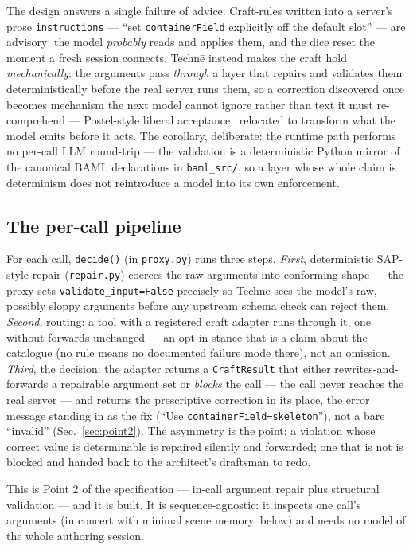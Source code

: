 \documentclass[sigconf,nonacm,screen,anonymous]{acmart}
\begin{document}
The design answers a single failure of advice. Craft-rules written into a server's prose \texttt{instructions} --- ``set \texttt{containerField} explicitly off the default slot'' --- are advisory: the model \emph{probably} reads and applies them, and the dice reset the moment a fresh session connects. Technē instead makes the craft hold \emph{mechanically}: the arguments pass \emph{through} a layer that repairs and validates them deterministically before the real server runs them, so a correction discovered once becomes mechanism the next model cannot ignore rather than text it must re-comprehend --- Postel-style liberal acceptance~\cite{postel} relocated to transform what the model emits before it acts. The corollary, deliberate: the runtime path performs no per-call LLM round-trip --- the validation is a deterministic Python mirror of the canonical BAML declarations in \texttt{baml\_src/}, so a layer whose whole claim is determinism does not reintroduce a model into its own enforcement.

\subsection{The per-call pipeline}

For each call, \texttt{decide()} (in \texttt{proxy.py}) runs three steps. \emph{First}, deterministic SAP-style repair (\texttt{repair.py}) coerces the raw arguments into conforming shape --- the proxy sets \texttt{validate\_input=False} precisely so Technē sees the model's raw, possibly sloppy arguments before any upstream schema check can reject them. \emph{Second}, routing: a tool with a registered craft adapter runs through it, one without forwards unchanged --- an opt-in stance that is a claim about the catalogue (no rule means no documented failure mode there), not an omission. \emph{Third}, the decision: the adapter returns a \texttt{CraftResult} that either rewrites-and-forwards a repairable argument set or \emph{blocks} the call --- the call never reaches the real server --- and returns the prescriptive correction in its place, the error message standing in as the fix (``Use \texttt{containerField=\textquotesingle{}skeleton\textquotesingle{}}''), not a bare ``invalid'' (Sec.~\ref{sec:point2}). The asymmetry is the point: a violation whose correct value is determinable is repaired silently and forwarded; one that is not is blocked and handed back to the architect's draftsman to redo.

This is Point 2 of the specification --- in-call argument repair plus structural validation --- and it is built. It is sequence-agnostic: it inspects one call's arguments (in concert with minimal scene memory, below) and needs no model of the whole authoring session.
\end{document}
